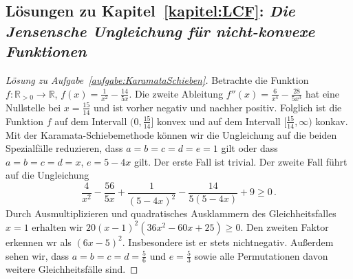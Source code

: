 \subsection*{Lösungen zu Kapitel~\ref{kapitel:LCF}: \emph{Die Jensensche Ungleichung für nicht-konvexe Funktionen}}

\begin{proof}[Lösung zu Aufgabe~\ref{aufgabe:KaramataSchieben}]
	Betrachte die Funktion $f\colon \mathbb R_{>0}\rightarrow \mathbb R$, $f(x)=\frac1{x^2}-\frac{14}{5x}$. Die zweite Ableitung $f''(x)=\frac{6}{x^4}-\frac{28}{5x^3}$ hat eine Nullstelle bei $x=\frac{15}{14}$ und ist vorher negativ und nachher positiv. Folglich ist die Funktion $f$ auf dem Intervall $\bigl(0,\frac{15}{14}\bigr]$ konvex und auf dem Intervall $\bigl[\frac{15}{14},\infty\bigl)$ konkav. Mit der Karamata-Schiebemethode können wir die Ungleichung auf die beiden Spezialfälle reduzieren, dass $a=b=c=d=e=1$ gilt oder dass $a=b=c=d=x$, $e=5-4x$ gilt. Der erste Fall ist trivial. Der zweite Fall führt auf die Ungleichung
	\begin{equation*}
		\frac{4}{x^2}-\frac{56}{5x}+\frac{1}{(5-4x)^2}-\frac{14}{5(5-4x)}+9\geqslant 0\,.
	\end{equation*}
	Durch Ausmultiplizieren und quadratisches Ausklammern des Gleichheitsfalles $x=1$ erhalten wir $20(x-1)^2(36x^2-60x+25)\geqslant 0$. Den zweiten Faktor erkennen wr als $(6x-5)^2$. Insbesondere ist er stets nichtnegativ. Außerdem sehen wir, dass $a=b=c=d=\frac{5}{6}$ und $e=\frac53$ sowie alle Permutationen davon weitere Gleichheitsfälle sind.
\end{proof}

